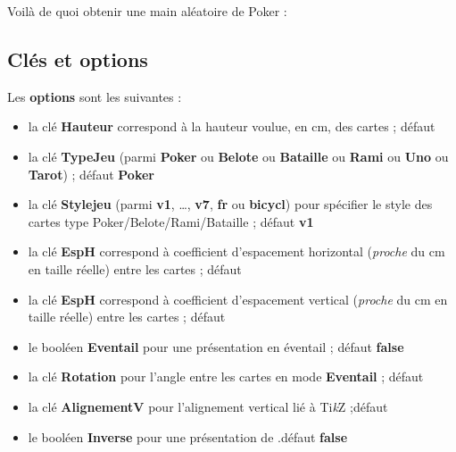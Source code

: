 \documentclass[a4paper]{article}
\providecommand\tikzlogo{Ti\textit{k}Z}
\let\TikZ\tikzlogo
\newcommand\cmaj[1]{\tcbox[vignetteMaJ]{#1}\xspace}
\newcommand\Cle[1]{{\bfseries\sffamily\textlangle #1\textrangle}}
\begin{document}
\begin{codetex}
\end{codetex}

\begin{codetex}[]
Voilà de quoi obtenir une main aléatoire de Poker :

\end{codetex}

\subsection{Clés et options}

\begin{codecles}
Les \Cle{options} sont les suivantes :

\begin{itemize}
	\item la clé \Cle{Hauteur} correspond à la hauteur voulue, en cm, des cartes ; \hfill{}défaut \Cle{4.25}
	\item la clé \Cle{TypeJeu} (parmi \Cle{Poker} ou \Cle{Belote} ou \Cle{Bataille} ou \Cle{Rami} ou \Cle{Uno} ou \Cle{Tarot}) ; \hfill{}défaut \Cle{Poker}
	\item \cmaj{0.3.5} la clé \Cle{Stylejeu} (parmi \Cle{v1}, \ldots, \Cle{v7}, \Cle{fr} ou \Cle{bicycl}) pour spécifier le style des cartes type \textsf{Poker/Belote/Rami/Bataille} ; \hfill{}défaut \Cle{v1}
	\item la clé \Cle{EspH} correspond à coefficient d'espacement horizontal (\textit{proche} du cm en taille réelle) entre les cartes ; \hfill{}défaut \Cle{1}
	\item la clé \Cle{EspH} correspond à coefficient d'espacement vertical (\textit{proche} du cm en taille réelle) entre les cartes ; \hfill{}défaut \Cle{0}
	\item le booléen \Cle{Eventail} pour une présentation en éventail ; \hfill{}défaut \Cle{false}
	\item la clé \Cle{Rotation} pour l'angle entre les cartes en mode \Cle{Eventail}  ; \hfill{}défaut \Cle{10}
	\item la clé \Cle{AlignementV} pour l'alignement vertical lié à \TikZ{} ;\hfill{}défaut \Cle{0.5}
	\item le booléen \Cle{Inverse} pour une présentation de .\hfill{}défaut \Cle{false}
\end{itemize}
\end{codecles}
\end{document}
